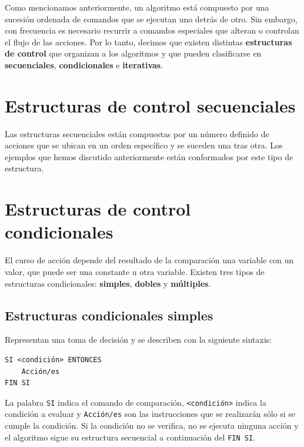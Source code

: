 \documentclass[]{book}
\begin{document}
Como mencionamos anteriormente, un algoritmo está compuesto por una sucesión ordenada de comandos que se ejecutan uno detrás de otro. Sin embargo, con frecuencia es necesario recurrir a comandos especiales que alteran o controlan el flujo de las acciones. Por lo tanto, decimos que existen distintas \textbf{estructuras de control} que organizan a los algoritmos y que pueden clasificarse en \textbf{secuenciales}, \textbf{condicionales} e \textbf{iterativas}.

\hypertarget{estructuras-de-control-secuenciales}{%
\section{Estructuras de control secuenciales}\label{estructuras-de-control-secuenciales}}

Las estructuras secuenciales están compuestas por un número definido de acciones que se ubican en un orden específico y se suceden una tras otra. Los ejemplos que hemos discutido anteriormente están conformados por este tipo de estructura.

\hypertarget{estructuras-de-control-condicionales}{%
\section{Estructuras de control condicionales}\label{estructuras-de-control-condicionales}}

El curso de acción depende del resultado de la comparación una variable con un valor, que puede ser una constante u otra variable. Existen tres tipos de estructuras condicionales: \textbf{simples}, \textbf{dobles} y \textbf{múltiples}.

\hypertarget{estructuras-condicionales-simples}{%
\subsection{Estructuras condicionales simples}\label{estructuras-condicionales-simples}}

Representan una toma de decisión y se describen con la siguiente sintaxis:

\begin{verbatim}
SI <condición> ENTONCES
    Acción/es
FIN SI
\end{verbatim}

La palabra \texttt{SI} indica el comando de comparación, \texttt{\textless{}condición\textgreater{}} indica la condición a evaluar y \texttt{Acción/es} son las instrucciones que se realizarán sólo si se cumple la condición. Si la condición no se verifica, no se ejecuta ninguna acción y el algoritmo sigue su estructura secuencial a continuación del \texttt{FIN\ SI}.
\end{document}
